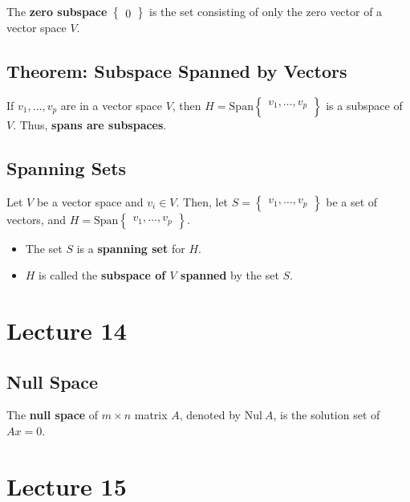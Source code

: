 \documentclass[12pt, letterpaper]{article}
\begin{document}
The \textbf{zero subspace} $
\begin{Bmatrix} 0
\end{Bmatrix} $ is the set consisting of only the zero vector of a
vector space $ V $.

\subsection*{Theorem: Subspace Spanned by Vectors}
If $ v_1, \hdots, v_p $ are in a vector space $ V $, then $ H = \textrm{Span}
\begin{Bmatrix}
  v_1, \hdots, v_p \\
\end{Bmatrix} $ is a subspace of $ V $. Thus, \textbf{spans are subspaces}.

\subsection*{Spanning Sets}

Let $ V $ be a vector space and $ v_i \in V $. Then, let $ S =
\begin{Bmatrix}
  v_1, \hdots, v_p
\end{Bmatrix} $ be a set of vectors, and $ H = \textrm{Span}
\begin{Bmatrix}
  v_1, \hdots, v_p
\end{Bmatrix} $.

\begin{itemize}
  \item The set $ S $ is a \textbf{spanning set} for $ H $.
  \item $ H $ is called the \textbf{subspace of $ V $ spanned} by the set $ S $.
\end{itemize}

\section*{Lecture 14}

\subsection*{Null Space}

The \textbf{null space} of $ m \times n $ matrix $ A $, denoted by $
\textrm{Nul} \: A $, is the solution set of $ Ax = 0 $.

\section*{Lecture 15}
\end{document}
